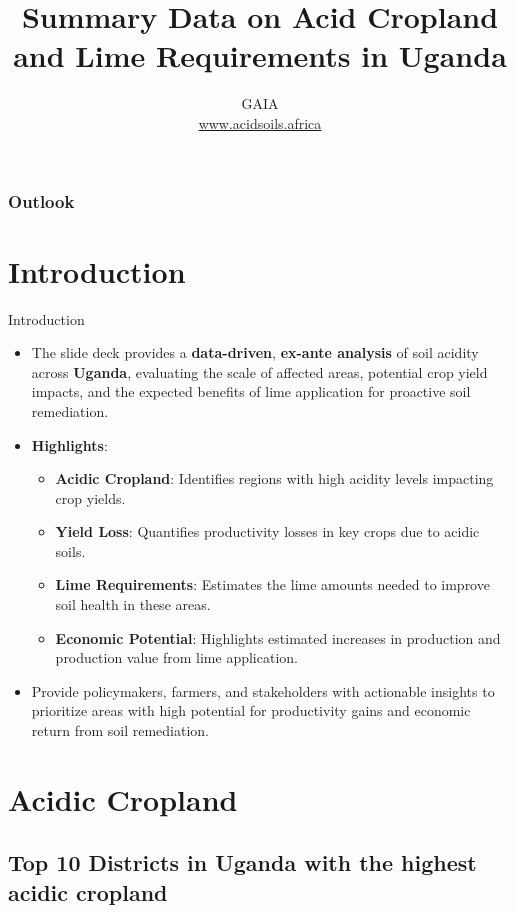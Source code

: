 \documentclass[xcolor=table, aspectratio=1610]{beamer}
\title[Uganda--Summary]{\textsf{Summary Data on Acid Cropland and Lime Requirements in Uganda}}
\author[GAIA]{GAIA\\ \href{www.acidsoils.africa}{www.acidsoils.africa} }
\institute[CIMMYT]
\begin{document}
\begin{frame}[plain]
\textsc{\titlepage}
\end{frame}

\begin{frame}
\frametitle{Outlook}
\tableofcontents 
\end{frame}

\section{Introduction}
\begin{frame}{Introduction}
    \begin{itemize}
        \item The slide deck provides a \textbf{data-driven}, \textbf{ex-ante analysis} of soil acidity across \textbf{Uganda}, evaluating the scale of affected areas, potential crop yield impacts, and the expected benefits of lime application for proactive soil remediation.
        \bigskip
        \item \textbf{Highlights}:
        \begin{itemize}
            \item \textbf{Acidic Cropland}: Identifies regions with high acidity levels impacting crop yields.
            \item \textbf{Yield Loss}: Quantifies productivity losses in key crops due to acidic soils.
            \item \textbf{Lime Requirements}: Estimates the lime amounts needed to improve soil health in these areas.
            \item \textbf{Economic Potential}: Highlights estimated increases in production and production value from lime application.
        \end{itemize}
        \bigskip
        \item Provide policymakers, farmers, and stakeholders with actionable insights to prioritize areas with high potential for productivity gains and economic return from soil remediation.
    \end{itemize}
\end{frame}
\section{Acidic Cropland}
\subsection*{Top 10 Districts in Uganda with the highest acidic cropland}
\end{document}
